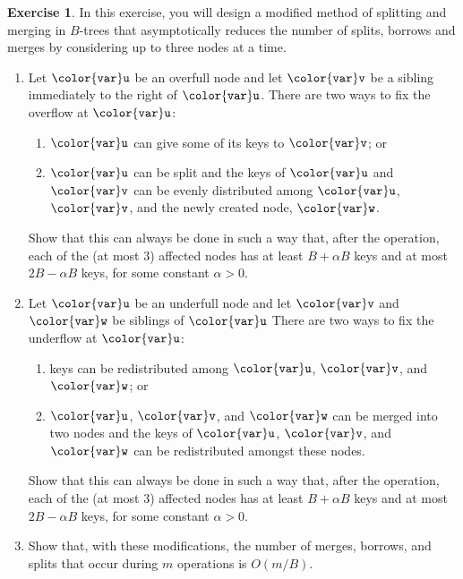 \documentclass[10pt]{book}
\theoremstyle{plain}
\theoremstyle{definition}
\newtheorem{exc}{Exercise}[chapter]
\begin{document}
\begin{exc}
  In this exercise, you will design a modified method of splitting and
  merging in $B$-trees that asymptotically reduces the number of splits,
  borrows and merges by considering up to three nodes at a time.
  \begin{enumerate}
    \item Let \ensuremath{\mathtt{{\color{var}u}}} be an overfull node and let \ensuremath{\mathtt{{\color{var}v}}} be a sibling immediately
    to the right of \ensuremath{\mathtt{{\color{var}u}}}.  There are two ways to fix the overflow at \ensuremath{\mathtt{{\color{var}u}}}:
    \begin{enumerate}
       \item \ensuremath{\mathtt{{\color{var}u}}} can give some of its keys to \ensuremath{\mathtt{{\color{var}v}}}; or
       \item \ensuremath{\mathtt{{\color{var}u}}} can be split and the keys of \ensuremath{\mathtt{{\color{var}u}}} and \ensuremath{\mathtt{{\color{var}v}}} can be evenly
        distributed among \ensuremath{\mathtt{{\color{var}u}}}, \ensuremath{\mathtt{{\color{var}v}}}, and the newly created node, \ensuremath{\mathtt{{\color{var}w}}}.
    \end{enumerate}
    Show that this can always be done in such a way that, after the
    operation, each of the (at most 3) affected nodes has at least
    $B+\alpha B$ keys and at most $2B-\alpha B$ keys, for some constant
    $\alpha > 0$.
    \item Let \ensuremath{\mathtt{{\color{var}u}}} be an underfull node and let \ensuremath{\mathtt{{\color{var}v}}} and \ensuremath{\mathtt{{\color{var}w}}} be siblings of \ensuremath{\mathtt{{\color{var}u}}}
    There are two ways to fix the underflow at \ensuremath{\mathtt{{\color{var}u}}}:
    \begin{enumerate}
       \item keys can be redistributed among \ensuremath{\mathtt{{\color{var}u}}}, \ensuremath{\mathtt{{\color{var}v}}}, and \ensuremath{\mathtt{{\color{var}w}}}; or
       \item \ensuremath{\mathtt{{\color{var}u}}}, \ensuremath{\mathtt{{\color{var}v}}}, and \ensuremath{\mathtt{{\color{var}w}}} can be merged into two nodes and the keys
        of \ensuremath{\mathtt{{\color{var}u}}}, \ensuremath{\mathtt{{\color{var}v}}}, and \ensuremath{\mathtt{{\color{var}w}}} can be redistributed amongst these nodes.
    \end{enumerate}
    Show that this can always be done in such a way that, after the
    operation, each of the (at most 3) affected nodes has at least
    $B+\alpha B$ keys and at most $2B-\alpha B$ keys, for some constant
    $\alpha > 0$.
    \item Show that, with these modifications, the number of 
      merges, borrows, and splits that occur during $m$ operations is $O(m/B)$.
  \end{enumerate}
\end{exc}
\end{document}
